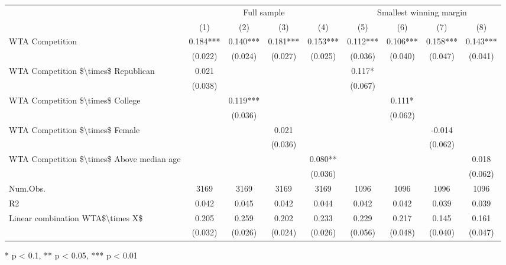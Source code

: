 \begin{table}[t]
\fontsize{12.0pt}{14.4pt}\selectfont
\begin{tabular*}{\linewidth}{@{\extracolsep{\fill}}lcccccccc}
\toprule
 & \multicolumn{4}{c}{Full sample} & \multicolumn{4}{c}{Smallest winning margin} \\ 
\cmidrule(lr){2-5} \cmidrule(lr){6-9}
  & (1) & (2) & (3) & (4) & (5) & (6) & (7) & (8) \\ 
\midrule\addlinespace[2.5pt]
WTA Competition & 0.184*** & 0.140*** & 0.181*** & 0.153*** & 0.112*** & 0.106*** & 0.158*** & 0.143*** \\ 
 & (0.022) & (0.024) & (0.027) & (0.025) & (0.036) & (0.040) & (0.047) & (0.041) \\ 
WTA Competition \$\textbackslash{}times\$ Republican & 0.021 &  &  &  & 0.117* &  &  &  \\ 
 & (0.038) &  &  &  & (0.067) &  &  &  \\ 
WTA Competition \$\textbackslash{}times\$ College &  & 0.119*** &  &  &  & 0.111* &  &  \\ 
 &  & (0.036) &  &  &  & (0.062) &  &  \\ 
WTA Competition \$\textbackslash{}times\$ Female &  &  & 0.021 &  &  &  & -0.014 &  \\ 
 &  &  & (0.036) &  &  &  & (0.062) &  \\ 
WTA Competition \$\textbackslash{}times\$ Above median age &  &  &  & 0.080** &  &  &  & 0.018 \\ 
{} & {} & {} & {} & {(0.036)} & {} & {} & {} & {(0.062)} \\ 
Num.Obs. & 3169 & 3169 & 3169 & 3169 & 1096 & 1096 & 1096 & 1096 \\ 
R2 & 0.042 & 0.045 & 0.042 & 0.044 & 0.042 & 0.042 & 0.039 & 0.039 \\ 
Linear combination WTA\$\textbackslash{}times X\$ & 0.205 & 0.259 & 0.202 & 0.233 & 0.229 & 0.217 & 0.145 & 0.161 \\ 
 & (0.032) & (0.026) & (0.024) & (0.026) & (0.056) & (0.048) & (0.040) & (0.047) \\ 
\bottomrule
\end{tabular*}
\begin{minipage}{\linewidth}
* p < 0.1, ** p < 0.05, *** p < 0.01\\
\end{minipage}
\end{table}

